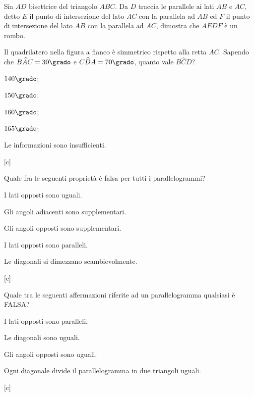 \begin{multicols}{2}
\begin{esercizio}
\label{ese:4.59}
Sia \(AD\) bisettrice del triangolo \(ABC\). Da \(D\) traccia le parallele 
ai lati \(AB\) e \(AC\), detto \(E\) il punto di intersezione del lato \(AC\) 
con la parallela ad \(AB\) ed \(F\) il punto di intersezione del lato 
\(AB\) con la parallela ad \(AC\), dimostra che \(AEDF\) è un rombo.
\end{esercizio}

\end{multicols}

\noindent\begin{minipage}{0.6\textwidth}\parindent15pt
\begin{esercizio}
\label{ese:4.60}
Il quadrilatero nella figura a fianco è simmetrico rispetto alla 
retta \(AC\).
Sapendo che \(B\widehat{A}C = 30\grado\) e \(C\widehat{D}A = 70\grado\), 
quanto vale \(B\widehat{C}D\)?
\begin{enumeratea}
\item \(140\grado\);
\item \(150\grado\);
\item \(160\grado\);
\item \(165\grado\);
\item Le informazioni sono insufficienti.
\end{enumeratea}
\hfill[c]
\end{esercizio}
\end{minipage}\hfil
\begin{minipage}{0.4\textwidth}
	\centering
\end{minipage}

\begin{esercizio}
\label{ese:4.61}
Quale fra le seguenti proprietà è falsa per tutti i parallelogrammi?
\begin{enumeratea}
\item I lati opposti sono uguali.
\item Gli angoli adiacenti sono supplementari.
\item Gli angoli opposti sono supplementari.
\item I lati opposti sono paralleli.
\item Le diagonali si dimezzano scambievolmente.
\end{enumeratea}
\hfill[c]
\end{esercizio}

\begin{esercizio}
\label{ese:4.62}
Quale tra le seguenti affermazioni riferite ad un parallelogramma 
qualsiasi è FALSA?
\begin{enumeratea}
\item I lati opposti sono paralleli.
\item Le diagonali sono uguali.
\item Gli angoli opposti sono uguali.
\item Ogni diagonale divide il parallelogramma in due triangoli 
uguali.
\end{enumeratea}
\hfill[c]
\end{esercizio}

